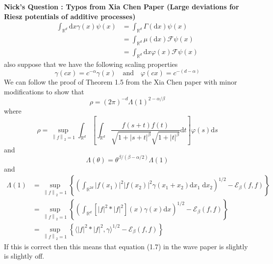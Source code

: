 \documentclass[a4paper,11pt]{article}
\numberwithin{equation}{section}
\theoremstyle{plain}
\theoremstyle{definition}
\newcommand{\ud}{\ensuremath{\mathrm{d} }}
\newcommand{\Norm}[1]{\left\|  #1   \right\|}
\newcommand{\R}{\mathbb{R}}
\newcounter{NQ}
\newenvironment{NickQuestion}[1][] %
{\refstepcounter{NQ}
	\begin{mdframed}[backgroundcolor=lightgray]\textbf{Nick's Question \theNQ \: #1~~}~~~\noindent}%
	{\end{mdframed}}
\numberwithin{NQ}{section}
\numberwithin{LQ}{section}
\numberwithin{ZQ}{section}
\begin{document}
\begin{NickQuestion}[ : Typos from Xia Chen Paper (Large deviations for Riesz potentials of additive processes) ]
		\begin{align*}
		\int_{\R^d} \ud x \gamma( x) \psi(x) & = \int_{\R^d} \Gamma(\ud x) \psi(x)
		\\& = \int_{\R^d} \mu(\ud x) \mathcal{F}\psi(x)
		\\& = \int_{\R^d} \ud x \varphi(x) \mathcal{F}\psi(x)
		\end{align*}
		also suppose that we have the following scaling properties
		\[
		\gamma(cx) = c^{-\alpha}\gamma(x) \quad \text{and} \quad \varphi(cx) = c^{-(d -\alpha)}
		\]
		We can follow the proof of Theorem 1.5 from the Xia Chen paper with minor modifications to show that
		\[
		\rho = (2\pi)^{-d}\Lambda(1)^{2-{\alpha/\beta}}
		\]
		where
		\[
		\rho = \sup_{\Norm{f}_2 = 1} \int_{\R^d}\left[ \int_{\R^d} \frac{f(s+t)f(t)}{\sqrt{1+|s+t|^\beta}\sqrt{1+|t|^\beta}} \ud t \right] \varphi(s) \ud s
		\]
		and
		\[
		\Lambda(\theta) = \theta^{\beta/(\beta - \alpha/2)}\Lambda(1)
		\]
		and
		\begin{align*}
		\Lambda(1) &= \sup_{\Norm{f}_2 =1} \left\{ \left( \int_{\R^{2d}} |f(x_1)|^2 |f(x_2)|^2 \gamma(x_1+x_2) \ud x_1 \; \ud x_2 \right)^{1/2} - \mathcal{E}_\beta(f,f) \right\}
		\\& = \sup_{\Norm{f}_2 =1} \left\{ \left( \int_{\R^d} \left[|f|^2 * |f|^2\right](x) \gamma(x) \ud x\right)^{1/2} - \mathcal{E}_\beta(f,f) \right\}
		\\& =  \sup_{\Norm{f}_2 =1} \left\{ \langle  |f|^2*|f|^2, \gamma \rangle^{1/2} - \mathcal{E}_\beta(f,f) \right\}
		\end{align*}
		If this is correct then this means that equation (1.7) in the wave paper is slightly is slightly off.
	\end{NickQuestion}
\end{document}
